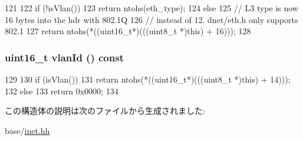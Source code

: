 \begin{DoxyCode}
121                           {
122         if (!isVlan())
123             return ntohs(eth_type);
124         else
125             // L3 type is now 16 bytes into the hdr with 802.1Q
126             // instead of 12.  dnet/eth.h only supports 802.1
127             return ntohs(*((uint16_t*)(((uint8_t *)this) + 16)));
128     }
\end{DoxyCode}
\hypertarget{structNet_1_1EthHdr_afc72e33f3356269c9ff905dfc17ed070}{
\subsubsection[{vlanId}]{\setlength{\rightskip}{0pt plus 5cm}uint16\_\-t vlanId () const}}
\label{structNet_1_1EthHdr_afc72e33f3356269c9ff905dfc17ed070}



\begin{DoxyCode}
129                             {
130         if (isVlan())
131             return ntohs(*((uint16_t*)(((uint8_t *)this) + 14)));
132         else
133             return 0x0000;
134     }
\end{DoxyCode}


この構造体の説明は次のファイルから生成されました:\begin{DoxyCompactItemize}
\item 
base/\hyperlink{inet_8hh}{inet.hh}\end{DoxyCompactItemize}
